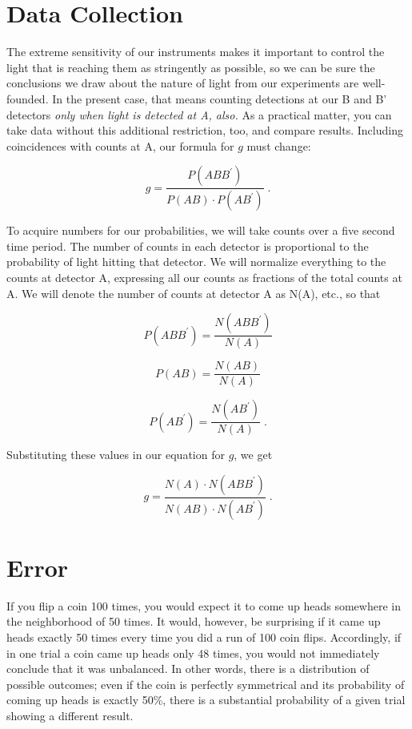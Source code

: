 
\section*{Data Collection}

The extreme sensitivity of our instruments makes it important to control the light that is 
reaching them as stringently as possible, so we can be sure the conclusions we draw about the nature of light from our experiments are well-founded. In the present case, that means counting detections at our B and B' detectors \emph{only when light is detected at A, also.} As a practical matter, you can take data without this additional restriction, too, and compare results. Including coincidences with counts at A, our formula for $g$ must change:

\[g = \frac{P(ABB^\prime)}{P(AB) \cdot P(AB^\prime)} \; .\]


To acquire numbers for our probabilities, we will take counts over a five second time period.  The number of counts in each detector is proportional to the probability of light hitting that detector.  We will normalize everything to the counts at detector A, expressing all our counts as fractions of the total counts at A.  We will denote the number of counts at detector A as N(A), etc., so that

\[P(ABB^\prime) = \frac{N(ABB^\prime)}{N(A)} \]


 \[P(AB) = \frac{N(AB)}{N(A)} \]

\[P(AB^\prime) = \frac{N(AB^\prime)}{N(A)} \; . \]

\noindent Substituting these values in our equation for $g$, we get

\[g = \frac{N(A) \cdot N(ABB^\prime)}{N(AB) \cdot N(AB^\prime)} \; . \]

\section*{Error}

If you flip a coin 100 times, you would expect it to come up heads somewhere in the neighborhood of 50 times. It would, however, be surprising if it came up heads exactly 50 times every time you did a run of 100 coin flips. Accordingly, if in one trial a coin came up heads only 48 times, you would not immediately conclude that it was unbalanced. In other words, there is a distribution of possible outcomes; even if the coin is perfectly symmetrical and its probability of coming up heads is exactly 50\%, there is a substantial probability of a given trial showing a different result.

